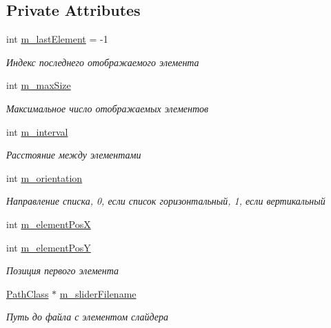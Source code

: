 \subsection*{Private Attributes}
\begin{DoxyCompactItemize}
\item 
int \hyperlink{class_list_element_class_aa184fa59eb2d5419bd589ac40abbef0b}{m\+\_\+last\+Element} = -\/1
\begin{DoxyCompactList}\small\item\em Индекс последнего отображаемого элемента \end{DoxyCompactList}\item 
int \hyperlink{class_list_element_class_a6f8ed03e61ba1e663d1da288a08c0764}{m\+\_\+max\+Size}
\begin{DoxyCompactList}\small\item\em Максимальное число отображаемых элементов \end{DoxyCompactList}\item 
int \hyperlink{class_list_element_class_ac2f53927870594daa919ad94c0eb6346}{m\+\_\+interval}
\begin{DoxyCompactList}\small\item\em Расстояние между элементами \end{DoxyCompactList}\item 
int \hyperlink{class_list_element_class_ad7636656b5fad94654c1106deea90114}{m\+\_\+orientation}
\begin{DoxyCompactList}\small\item\em Направление списка, 0, если список горизонтальный, 1, если вертикальный \end{DoxyCompactList}\item 
int \hyperlink{class_list_element_class_aecd98c7538cc459b3da43e6595e64dcc}{m\+\_\+element\+PosX}
\item 
int \hyperlink{class_list_element_class_a939c1369465c44ce7b92d5c705cbda16}{m\+\_\+element\+PosY}
\begin{DoxyCompactList}\small\item\em Позиция первого элемента \end{DoxyCompactList}\item 
\hyperlink{class_path_class}{Path\+Class} $\ast$ \hyperlink{class_list_element_class_a04cbecb6cca90506e861d00fd45619ae}{m\+\_\+slider\+Filename}
\begin{DoxyCompactList}\small\item\em Путь до файла с элементом слайдера \end{DoxyCompactList}\item 

\end{DoxyCompactItemize}
